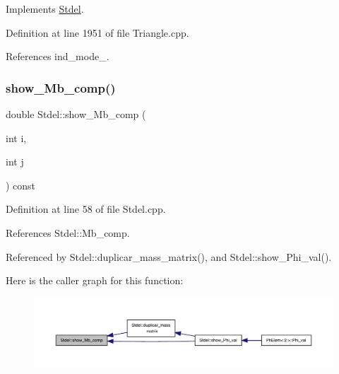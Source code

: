 Implements \hyperlink{classStdel_aa97cf7534697be1f2e02ff540ed7433b}{Stdel}.



Definition at line 1951 of file Triangle.\+cpp.



References ind\+\_\+mode\+\_\+.

\mbox{\label{classStdel_a4860f0f650640f859c5f75c206ee1f60}} 
\subsubsection{\texorpdfstring{show\+\_\+\+Mb\+\_\+comp()}{show\_Mb\_comp()}}
{\footnotesize\ttfamily double Stdel\+::show\+\_\+\+Mb\+\_\+comp (\begin{DoxyParamCaption}\item[{int}]{i,  }\item[{int}]{j }\end{DoxyParamCaption}) const\hspace{0.3cm}{\ttfamily [inherited]}}



Definition at line 58 of file Stdel.\+cpp.



References Stdel\+::\+Mb\+\_\+comp.



Referenced by Stdel\+::duplicar\+\_\+mass\+\_\+matrix(), and Stdel\+::show\+\_\+\+Phi\+\_\+val().

Here is the caller graph for this function\+:
\nopagebreak
\begin{figure}[H]
\begin{center}
\leavevmode
\includegraphics[width=350pt]{classStdel_a4860f0f650640f859c5f75c206ee1f60_icgraph}
\end{center}
\end{figure}
\mbox{\label{classStdel_a44d5aa234e02fb41afd5a4e5e45fadc4}} 
